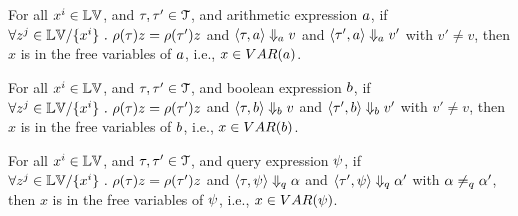 \begin{lem}
\label{lem:inv_a}
For all {$ x^i \in \mathbb{LV}$, and $\mathtt{\tau}, \mathtt{\tau}' \in \mathcal{T}$,  and arithmetic expression $a$}, if
$ \forall z^j \in \mathbb{LV} / \{x^i\} ~.~ 
\rho(\mathtt{\tau}) z = \rho(\mathtt{\tau}') z $ and $\langle \mathtt{\tau}, a \rangle \Downarrow_a v $ and 
$\langle \mathtt{\tau}', a \rangle \Downarrow_a v' $ with $v' \neq v$, then $ x $ is in the free variables of $a$, i.e., $x \in VAR(a)$.
%
\end{lem}
%
%
\begin{lem}
\label{lem:inv_b}
For all {$ x^i \in \mathbb{LV}$, and $\mathtt{\tau}, \mathtt{\tau}' \in \mathcal{T}$,  and boolean expression $b$}, if
$ \forall z^j \in \mathbb{LV} / \{x^i\} ~.~ 
\rho(\mathtt{\tau}) z = \rho(\mathtt{\tau}') z $ and $\langle \mathtt{\tau}, b \rangle \Downarrow_b v $ and 
$\langle \mathtt{\tau}', b \rangle \Downarrow_b v' $ with $v' \neq v$, then $ x $ is in the free variables of $b$, i.e., $x \in VAR(b)$.
\end{lem}
%
\begin{lem}
\label{lem:inv_q}
For all {$ x^i \in \mathbb{LV}$, and $\mathtt{\tau}, \mathtt{\tau}' \in \mathcal{T}$,  and query expression $\psi$}, if
$ \forall z^j \in \mathbb{LV} / \{x^i\} ~.~ 
\rho(\mathtt{\tau}) z = \rho(\mathtt{\tau}') z $ and $\langle \mathtt{\tau}, \psi \rangle \Downarrow_q \alpha $ and 
$\langle \mathtt{\tau}', \psi \rangle \Downarrow_q \alpha' $ with $\alpha \neq_{q} \alpha'$, then $ x $ is in the free variables of $\psi$, i.e., $x \in VAR(\psi)$.
\end{lem}
%
%
